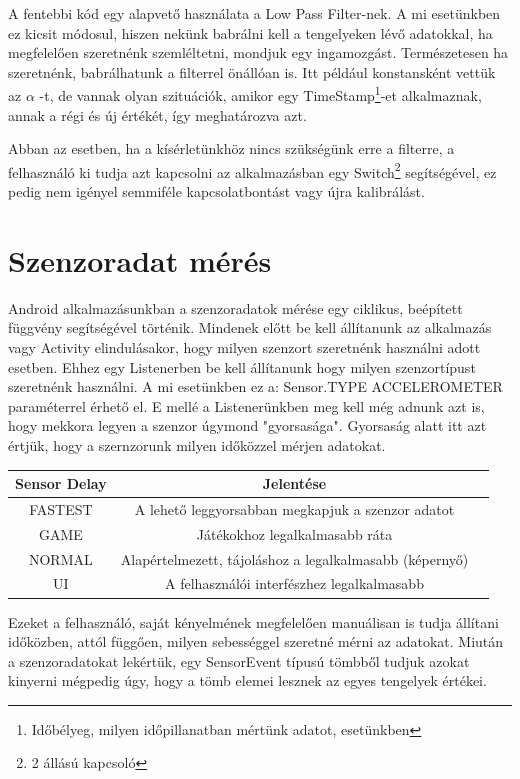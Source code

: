 \documentclass{thesis-ekf}
\theoremstyle{definition}
\theoremstyle{remark}
\begin{document}
\par A fentebbi kód egy alapvető használata a Low Pass Filter-nek. A mi esetünkben ez kicsit módosul, hiszen nekünk babrálni kell a tengelyeken lévő adatokkal, ha megfelelően szeretnénk szemléltetni, mondjuk egy ingamozgást. Természetesen ha szeretnénk, babrálhatunk a filterrel önállóan is. Itt például konstansként vettük az $\alpha$ -t, de vannak olyan szituációk, amikor egy TimeStamp\footnote{Időbélyeg, milyen időpillanatban mértünk adatot, esetünkben}-et alkalmaznak, annak a régi és új értékét, így meghatározva azt.
\par Abban az esetben, ha a kísérletünkhöz nincs szükségünk erre a filterre, a felhasználó ki tudja azt kapcsolni az alkalmazásban egy Switch\footnote{2 állású kapcsoló} segítségével, ez pedig nem igényel semmiféle kapcsolatbontást vagy újra kalibrálást.
\section{Szenzoradat mérés}
Android alkalmazásunkban a szenzoradatok mérése egy ciklikus, beépített függvény segítségével történik. Mindenek előtt be kell állítanunk az alkalmazás vagy Activity elindulásakor, hogy milyen szenzort szeretnénk használni adott esetben. Ehhez egy Listenerben be kell állítanunk hogy milyen szenzortípust szeretnénk használni. A mi esetünkben ez a: Sensor.TYPE ACCELEROMETER paraméterrel érhető el. E mellé a Listenerünkben meg kell még adnunk azt is, hogy mekkora legyen a szenzor úgymond "gyorsasága". Gyorsaság alatt itt azt értjük, hogy a szernzorunk milyen időközzel mérjen adatokat.
\begin{center}
	\begin{tabular}{ |c|c|c| } 
		\hline
		Sensor Delay & Jelentése\\
		\hline\hline
		FASTEST & A lehető leggyorsabban megkapjuk a szenzor adatot  \\
		\hline
		GAME & Játékokhoz legalkalmasabb ráta\\
		\hline
		NORMAL & Alapértelmezett, tájoláshoz a legalkalmasabb (képernyő) \\
		\hline
		UI & A felhasználói interfészhez legalkalmasabb \\
		\hline
	\end{tabular}
\end{center}
\par Ezeket a felhasználó, saját kényelmének megfelelően manuálisan is tudja állítani időközben, attól függően, milyen sebességgel szeretné mérni az adatokat. Miután a szenzoradatokat lekértük, egy SensorEvent típusú tömbből tudjuk azokat kinyerni mégpedig úgy, hogy a tömb elemei lesznek az egyes tengelyek értékei.
\end{document}
